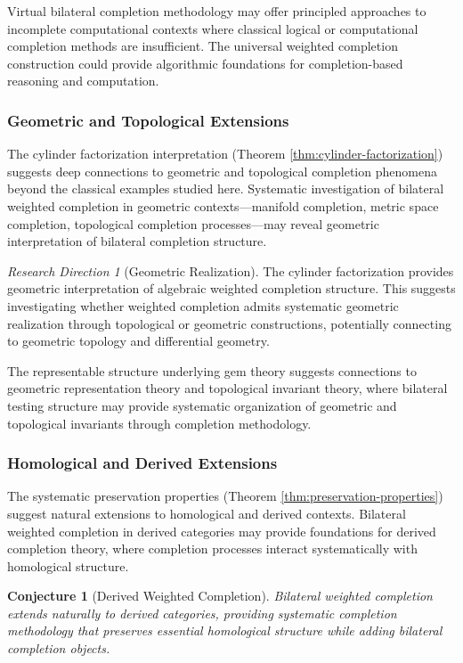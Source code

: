 \documentclass[11pt]{article}
\theoremstyle{plain}
\newtheorem{conjecture}[theorem]{Conjecture}
\theoremstyle{definition}
\theoremstyle{remark}
\newtheorem{research_direction}[theorem]{Research Direction}
\begin{document}
Virtual bilateral completion methodology may offer principled approaches to incomplete computational contexts where classical logical or computational completion methods are insufficient. The universal weighted completion construction could provide algorithmic foundations for completion-based reasoning and computation.

\subsubsection{Geometric and Topological Extensions}

The cylinder factorization interpretation (Theorem \ref{thm:cylinder-factorization}) suggests deep connections to geometric and topological completion phenomena beyond the classical examples studied here. Systematic investigation of bilateral weighted completion in geometric contexts—manifold completion, metric space completion, topological completion processes—may reveal geometric interpretation of bilateral completion structure.

\begin{research_direction}[Geometric Realization]
The cylinder factorization provides geometric interpretation of algebraic weighted completion structure. This suggests investigating whether weighted completion admits systematic geometric realization through topological or geometric constructions, potentially connecting to geometric topology and differential geometry.
\end{research_direction}

The representable structure underlying gem theory suggests connections to geometric representation theory and topological invariant theory, where bilateral testing structure may provide systematic organization of geometric and topological invariants through completion methodology.

\subsubsection{Homological and Derived Extensions}

The systematic preservation properties (Theorem \ref{thm:preservation-properties}) suggest natural extensions to homological and derived contexts. Bilateral weighted completion in derived categories may provide foundations for derived completion theory, where completion processes interact systematically with homological structure.

\begin{conjecture}[Derived Weighted Completion]
Bilateral weighted completion extends naturally to derived categories, providing systematic completion methodology that preserves essential homological structure while adding bilateral completion objects.
\end{conjecture}
\end{document}
